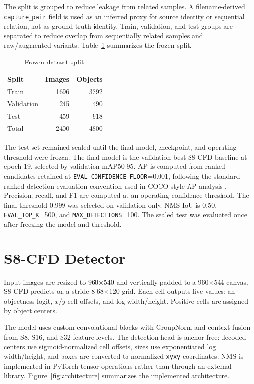 \documentclass[conference]{IEEEtran}
\begin{document}
The split is grouped to reduce leakage from related samples. A
filename-derived \texttt{capture\_pair} field is used as an inferred proxy for
source identity or sequential relation, not as ground-truth identity. Train,
validation, and test groups are separated to reduce overlap from sequentially
related samples and raw/augmented variants. Table~\ref{tab:data} summarizes the
frozen split.

\begin{table}[t]
\centering
\caption{Frozen dataset split.}
\label{tab:data}
\begin{tabular}{lrr}
\toprule
Split & Images & Objects \\
\midrule
Train & 1696 & 3392 \\
Validation & 245 & 490 \\
Test & 459 & 918 \\
\midrule
Total & 2400 & 4800 \\
\bottomrule
\end{tabular}
\end{table}

The test set remained sealed until the final model, checkpoint, and operating
threshold were frozen. The final model is the validation-best S8-CFD baseline at
epoch 19, selected by validation mAP50-95. AP is computed from ranked candidates
retained at \texttt{EVAL\_CONFIDENCE\_FLOOR}=0.001, following the standard
ranked detection-evaluation convention used in COCO-style AP analysis
\cite{lin2014microsoft}. Precision, recall, and F1 are computed at an operating
confidence threshold. The final threshold 0.999 was selected on validation only.
NMS IoU is 0.50, \texttt{EVAL\_TOP\_K}=500, and
\texttt{MAX\_DETECTIONS}=100. The sealed test was evaluated once after freezing
the model and threshold.

\section{S8-CFD Detector}
Input images are resized to 960$\times$540 and vertically padded to a
960$\times$544 canvas. S8-CFD predicts on a stride-8 68$\times$120 grid. Each
cell outputs five values: an objectness logit, $x/y$ cell offsets, and log
width/height. Positive cells are assigned by object centers.

The model uses custom convolutional blocks with GroupNorm and context fusion
from S8, S16, and S32 feature levels. The detection head is anchor-free: decoded
centers use sigmoid-normalized cell offsets, sizes use exponentiated log
width/height, and boxes are converted to normalized \texttt{xyxy} coordinates.
NMS is implemented in PyTorch tensor operations rather than through an external
library. Figure~\ref{fig:architecture} summarizes the implemented architecture.
\end{document}
